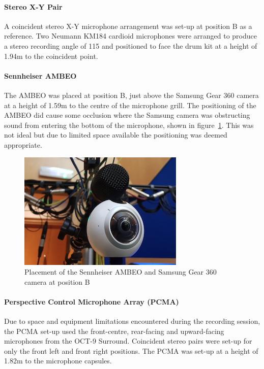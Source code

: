 			\paragraph{Stereo X-Y Pair}
			A coincident stereo X-Y microphone arrangement was set-up at position B as a reference. Two Neumann KM184 cardioid microphones were arranged to produce a stereo recording angle of 115\textdegree{} and positioned to face the drum kit at a height of 1.94m to the coincident point.\\

			\paragraph{Sennheiser AMBEO}
			The AMBEO was placed at position B, just above the Samsung Gear 360 camera at a height of 1.59m to the centre of the microphone grill. The positioning of the AMBEO did cause some occlusion where the Samsung camera was obstructing sound from entering the bottom of the microphone, shown in figure~\ref{ambeopic}. This was not ideal but due to limited space available the positioning was deemed appropriate. \\
			
			\begin{figure}[h]
			\begin{center}
				\includegraphics[width = \linewidth]{images/other/ambeopic.png}
				\caption{Placement of the Sennheiser AMBEO and Samsung Gear 360 camera at position B}
				\label{ambeopic}
			\end{center}
			\end{figure}

			\paragraph{Perspective Control Microphone Array (PCMA)}
			Due to space and equipment limitations encountered during the recording session, the PCMA set-up used the front-centre, rear-facing and upward-facing microphones from the OCT-9 Surround. Coincident stereo pairs were set-up for only the front left and front right positions. The PCMA was set-up at a height of 1.82m to the microphone capsules.\\

